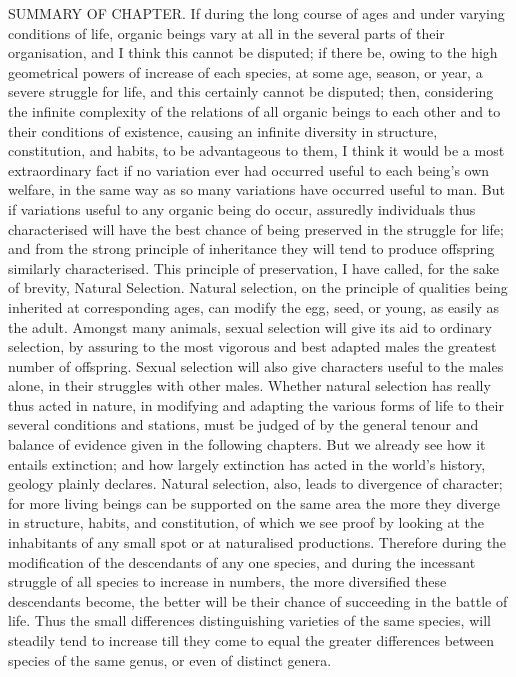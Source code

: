 SUMMARY OF CHAPTER.
If during the long course of ages and under varying conditions of life, organic beings vary at all in the several parts of their organisation, and I think this cannot be disputed; if there be, owing to the high geometrical powers of increase of each species, at some age, season, or year, a severe struggle for life, and this certainly cannot be disputed; then, considering the infinite complexity of the relations of all organic beings to each other and to their conditions of existence, causing an infinite diversity in structure, constitution, and habits, to be advantageous to them, I think it would be a most extraordinary fact if no variation ever had occurred useful to each being's own welfare, in the same way as so many variations have occurred useful to man. But if variations useful to any organic being do occur, assuredly individuals thus characterised will have the best chance of being preserved in the struggle for life; and from the strong principle of inheritance they will tend to produce offspring similarly characterised. This principle of preservation, I have called, for the sake of brevity, Natural Selection. Natural selection, on the principle of qualities being inherited at corresponding ages, can modify the egg, seed, or young, as easily as the adult. Amongst many animals, sexual selection will give its aid to ordinary selection, by assuring to the most vigorous and best adapted males the greatest number of offspring. Sexual selection will also give characters useful to the males alone, in their struggles with other males.
Whether natural selection has really thus acted in nature, in modifying and adapting the various forms of life to their several conditions and stations, must be judged of by the general tenour and balance of evidence given in the following chapters. But we already see how it entails extinction; and how largely extinction has acted in the world's history, geology plainly declares. Natural selection, also, leads to divergence of character; for more living beings can be supported on the same area the more they diverge in structure, habits, and constitution, of which we see proof by looking at the inhabitants of any small spot or at naturalised productions. Therefore during the modification of the descendants of any one species, and during the incessant struggle of all species to increase in numbers, the more diversified these descendants become, the better will be their chance of succeeding in the battle of life. Thus the small differences distinguishing varieties of the same species, will steadily tend to increase till they come to equal the greater differences between species of the same genus, or even of distinct genera.

